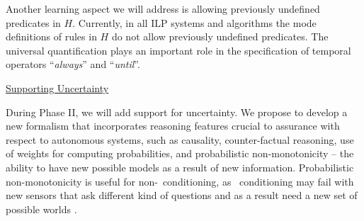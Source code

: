
Another learning aspect we will address is allowing previously undefined predicates in $H$. Currently, in all ILP systems and algorithms the mode definitions of rules in $H$ do not allow previously undefined predicates. 
The universal quantification plays an important role in the specification of temporal operators ``{\em always\/}'' and ``{\em until\/}''.

\noindent\underline{Supporting Uncertainty}

During Phase II, we will add support for uncertainty. 
We propose to develop a new formalism that incorporates reasoning features crucial to assurance with respect to autonomous systems, such as causality, counter-factual reasoning, use of weights for computing probabilities, 
and probabilistic non-monotonicity -- the ability to have new possible models as a result of new information. 
Probabilistic non-monotonicity is useful for non-\naive\ conditioning, as \naive\ conditioning may fail with new sensors that ask different kind of questions and as a result need a new set of possible worlds \cite{halpern2003, baral2007}. 

